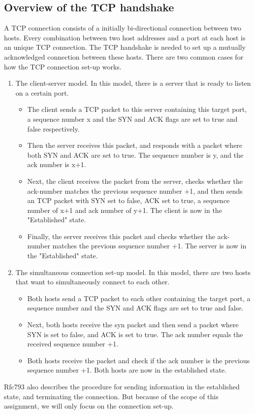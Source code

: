 \documentclass[twocolumn]{article}
\begin{document}
\subsection{Overview of the TCP handshake}
A TCP connection consists of a initially bi-directional connection between two hosts. Every combination between two host addresses and a port at each host is an unique TCP connection. The TCP handshake is needed to set up a mutually acknowledged connection between these hosts.
There are two common cases for how the TCP connection set-up works.
\begin{enumerate}
\item The client-server model. In this model, there is a server that is ready to listen on a certain port. 
\begin{itemize}
\item The client sends a TCP packet to this server containing this target port, a sequence number x and the SYN and ACK flags are set to true and false respectively.
\item Then the server receives this packet, and responds with a packet where both SYN and ACK are set to true. The sequence number is y, and the ack number is x+1.
\item Next, the client receives the packet from the server, checks whether the ack-number matches the previous sequence number +1, and then sends an TCP packet with SYN set to false, ACK set to true, a sequence number of x+1 and ack number of y+1. The client is now in the "Established" state.
\item Finally, the server receives this packet and checks whether the ack-number matches the previous sequence number +1. The server is now in the "Established" state.
\end{itemize}  
\item The simultaneous connection set-up model. In this model, there are two hosts that want to simultaneously connect to each other.
\begin{itemize}
\item Both hosts send a TCP packet to each other containing the target port, a sequence number and the SYN and ACK flags are set to true and false. 
\item Next, both hosts receive the syn packet and then send a packet where SYN is set to false, and ACK is set to true. The ack number equals the received sequence number +1.
\item Both hosts receive the packet and check if the ack number is the previous sequence number +1. Both hosts are now in the established state.
\end{itemize}
\end{enumerate}
Rfc793 also describes the procedure for sending information in the established state, and terminating the connection. But because of the scope of this assignment, we will only focus on the connection set-up.
\end{document}
